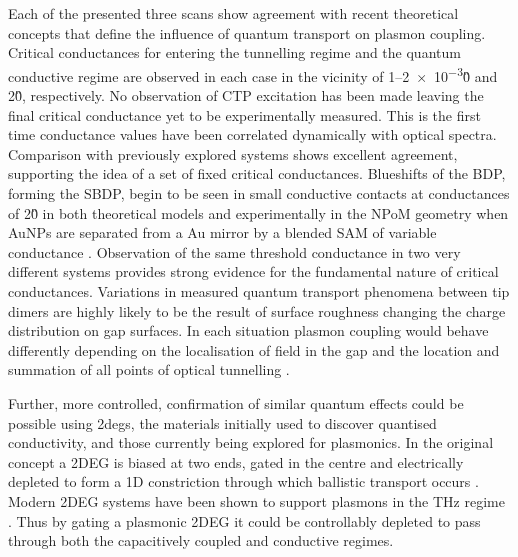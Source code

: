 \documentclass[a4paper]{article}
\begin{document}
Each of the presented three scans show agreement with recent theoretical concepts that define the influence of quantum transport on plasmon coupling. Critical conductances for entering the tunnelling regime and the quantum conductive regime are observed in each case in the vicinity of 1--\num{2e-3}\G0 and 2\G0, respectively. No observation of CTP excitation has been made leaving the final critical conductance yet to be experimentally measured. This is the first time conductance values have been correlated dynamically with optical spectra. Comparison with previously explored systems shows excellent agreement, supporting the idea of a set of fixed critical conductances. Blueshifts of the BDP, forming the SBDP, begin to be seen in small conductive contacts at conductances of 2\G0 in both theoretical models \cite{perez2010, perez2011} and experimentally in the NPoM geometry when AuNPs are separated from a Au mirror by a blended SAM of variable conductance \cite{benz2014}. Observation of the same threshold conductance in two very different systems provides strong evidence for the fundamental nature of critical conductances. Variations in measured quantum transport phenomena between tip dimers are highly likely to be the result of surface roughness changing the charge distribution on gap surfaces. In each situation plasmon coupling would behave differently depending on the localisation of field in the gap and the location and summation of all points of optical tunnelling \cite{barbry2015}.

Further, more controlled, confirmation of similar quantum effects could be possible using \glspl{2deg}, the materials initially used to discover quantised conductivity, and those currently being explored for plasmonics. In the original concept a 2DEG is biased at two ends, gated in the centre and electrically depleted to form a 1D constriction through which ballistic transport occurs \cite{van1988quantized, wharam1988one}. Modern 2DEG systems have been shown to support plasmons in the THz regime \cite{koppens2011graphene, christensen2011graphene, chen2012optical}. Thus by gating a plasmonic 2DEG it could be controllably depleted to pass through both the capacitively coupled and conductive regimes.
\end{document}
